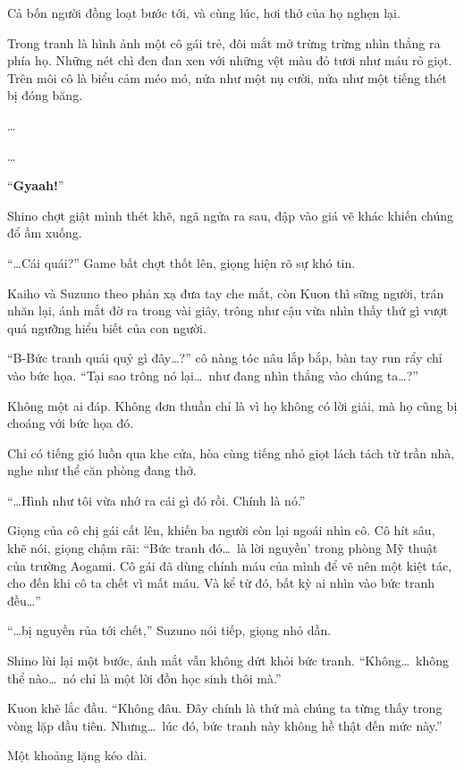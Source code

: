 \documentclass[../main.tex]{subfiles}
\begin{document}
Cả bốn người đồng loạt bước tới, và cùng lúc, hơi thở của họ nghẹn lại.

Trong tranh là hình ảnh một cô gái trẻ, đôi mắt mở trừng trừng nhìn thẳng ra phía họ. Những nét chì đen đan xen với những vệt màu đỏ tươi như máu rỏ giọt.  Trên môi cô là biểu cảm méo mó, nửa như một nụ cười, nửa như một tiếng thét bị đóng băng.


\dots

\dots

``\textbf{Gyaah!}''

Shino chợt giật mình thét khẽ, ngã ngửa ra sau, đập vào giá vẽ khác khiến chúng đổ ầm xuống.

``\dots Cái quái?'' Game bất chợt thốt lên, giọng hiện rõ sự khó tin.

Kaiho và Suzuno theo phản xạ đưa tay che mắt, còn Kuon thì sững người, trán nhăn lại, ánh mắt đờ ra trong vài giây, trông như cậu vừa nhìn thấy thứ gì vượt quá ngưỡng hiểu biết của con người.

``B-Bức tranh quái quỷ gì đây\dots?'' cô nàng tóc nâu lắp bắp, bàn tay run rẩy chỉ vào bức họa. ``Tại sao trông nó lại\dots\ như đang nhìn thẳng vào chúng ta\dots?''

Không một ai đáp. Không đơn thuần chỉ là vì họ không có lời giải, mà họ cũng bị choáng với bức họa đó.

Chỉ có tiếng gió luồn qua khe cửa, hòa cùng tiếng nhỏ giọt lách tách từ trần nhà, nghe như thể căn phòng đang thở.

``\dots Hình như tôi vừa nhớ ra cái gì đó rồi. Chính là nó.''

Giọng của cô chị gái cất lên, khiến ba người còn lại ngoái nhìn cô. Cô hít sâu, khẽ nói, giọng chậm rãi: ``Bức tranh đó\dots\ là lời nguyền' trong phòng Mỹ thuật của trường Aogami. Cô gái đã dùng chính máu của mình để vẽ nên một kiệt tác, cho đến khi cô ta chết vì mất máu. Và kể từ đó, bất kỳ ai nhìn vào bức tranh đều\dots''

``\dots bị nguyền rủa tới chết,'' Suzuno nói tiếp, giọng nhỏ dần.

Shino lùi lại một bước, ánh mắt vẫn không dứt khỏi bức tranh. ``Không\dots\ không thể nào\dots\ nó chỉ là một lời đồn học sinh thôi mà.''

Kuon khẽ lắc đầu. ``Không đâu. Đây chính là thứ mà chúng ta từng thấy trong vòng lặp đầu tiên. Nhưng\dots\ lúc đó, bức tranh này không hề thật đến mức này.''

Một khoảng lặng kéo dài.
\end{document}
